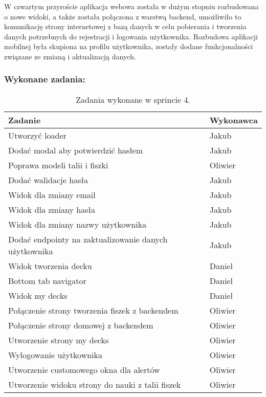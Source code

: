 W czwartym przyroście aplikacja webowa została w dużym stopniu rozbudowana o nowe widoki, a także została połączona z warstwą backend, umożliwiło to komunikację strony internetowej z bazą danych w celu pobierania i tworzenia danych potrzebnych do rejestracji i logowania użytkownika. Rozbudowa aplikacji mobilnej  była skupiona na profilu użytkownika, zostały dodane funkcjonalności związane ze zmianą i aktualizacją danych.

\subsubsection{Wykonane zadania:}

\begin{table}[H]
\centering
\begin{tabularx}{\textwidth}{|p{}|X|}
    \hline
    \textbf{Zadanie} & \textbf{Wykonawca} \\
    \hline
    [MOBILE] Utworzyć loader & Jakub \\
    \hline
    [MOBILE] Dodać modal aby potwierdzić hasłem & Jakub \\
    \hline
    [BACKEND] Poprawa modeli talii i fiszki & Oliwier \\
    \hline
    [MOBILE] Dodać walidacje hasła & Jakub \\
    \hline
    [MOBILE] Widok dla zmiany email & Jakub \\
    \hline
    [MOBILE] Widok dla zmiany hasła & Jakub \\
    \hline
    [MOBILE] Widok dla zmiany nazwy użytkownika & Jakub \\
    \hline
    [BACKEND] Dodać endpointy na zaktualizowanie danych użytkownika & Jakub \\
    \hline
    [MOBILE] Widok tworzenia decku & Daniel \\
    \hline
    [MOBILE] Bottom tab navigator & Daniel \\
    \hline
    [MOBILE] Widok my decks & Daniel \\
    \hline
    [WEB] Połączenie strony tworzenia fiszek z backendem & Oliwier \\
    \hline
    [WEB] Połączenie strony domowej z backendem & Oliwier \\
    \hline
    [WEB] Utworzenie strony my decks & Oliwier \\
    \hline
    [WEB] Wylogowanie użytkownika & Oliwier \\
    \hline
    [WEB] Utworzenie customowego okna dla alertów & Oliwier \\
    \hline
    [WEB] Utworzenie widoku strony do nauki z talii fiszek & Oliwier \\
    \hline
\end{tabularx}
            \caption{Zadania wykonane w sprincie 4.}
\end{table}

